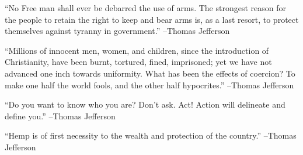 \documentclass{article}%
\begin{document}
\linebreak%
\vspace{1mm}%
\begin{minipage}{\textwidth}%
\flushleft%
“No Free man shall ever be debarred the use of arms. The strongest reason for the people to retain the right to keep and bear arms is, as a last resort, to protect themselves against tyranny in government.”%
\linebreak%
\vspace{1mm}%
–Thomas Jefferson%
\linebreak%
\vspace{1mm}%
\end{minipage}%
\linebreak%
\vspace{1mm}%
\begin{minipage}{\textwidth}%
\flushleft%
“Millions of innocent men, women, and children, since the introduction of Christianity, have been burnt, tortured, fined, imprisoned; yet we have not advanced one inch towards uniformity. What has been the effects of coercion? To make one half the world fools, and the other half hypocrites.”%
\linebreak%
\vspace{1mm}%
–Thomas Jefferson%
\linebreak%
\vspace{1mm}%
\end{minipage}%
\linebreak%
\vspace{1mm}%
\begin{minipage}{\textwidth}%
\flushleft%
“Do you want to know who you are? Don't ask. Act! Action will delineate and define you.”%
\linebreak%
\vspace{1mm}%
–Thomas Jefferson%
\linebreak%
\vspace{1mm}%
\end{minipage}%
\linebreak%
\vspace{1mm}%
\begin{minipage}{\textwidth}%
\flushleft%
“Hemp is of first necessity to the wealth and protection of the country.”%
\linebreak%
\vspace{1mm}%
–Thomas Jefferson%
\linebreak%
\vspace{1mm}%
\end{minipage}%
\linebreak%
\end{document}
